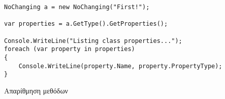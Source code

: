 \begin{listing}[htbp]
\begin{verbatim}
NoChanging a = new NoChanging("First!");

var properties = a.GetType().GetProperties();

Console.WriteLine("Listing class properties...");
foreach (var property in properties)
{
    Console.WriteLine(property.Name, property.PropertyType);
}
\end{verbatim}
\caption{Απαρίθμηση μεθόδων}
\label{reflectionProperties}
\end{listing}